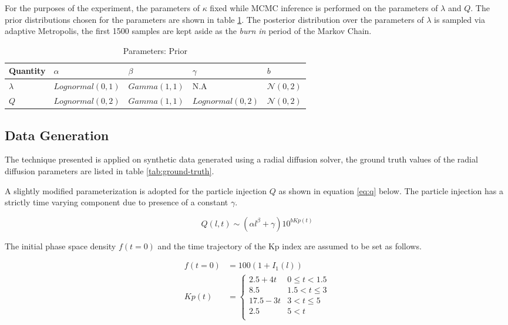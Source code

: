 \documentclass{article}
\begin{document}
For the purposes of the experiment, the parameters of $\kappa$ fixed while MCMC inference 
is performed on the parameters of $\lambda$ and $Q$. The prior distributions chosen for the parameters 
are shown in table \ref{tab:prior}. The posterior distribution over the parameters of $\lambda$ is 
sampled via adaptive Metropolis, the first 1500 samples are kept aside as the \emph{burn in} period
of the Markov Chain.

\begin{table}[t]
  \caption{Parameters: Prior}
  \label{tab:prior}
  \centering
  \begin{tabular}{lllll}
    \toprule
    \cmidrule{1-2}
    Quantity     & $\alpha$     & $\beta$ & $\gamma$ & $b$ \\
    \midrule
    $\lambda$ & $Lognormal(0, 1)$ & $Gamma(1, 1)$ & N.A & $\mathcal{N}(0, 2)$ \\
    $Q$ & $Lognormal(0, 2)$ & $Gamma(1, 1)$ & $Lognormal(0, 2)$ & $\mathcal{N}(0, 2)$ \\
    \bottomrule
  \end{tabular}
\end{table}


\subsection*{Data Generation}

The technique presented is applied on synthetic data generated using a radial diffusion solver, 
the ground truth values of the radial diffusion parameters are listed in table \ref{tab:ground-truth}.

A slightly modified parameterization is adopted for the particle injection $Q$ as shown in equation \ref{eq:q}
below. The particle injection has a strictly time varying component due to presence of a constant $\gamma$.

\begin{equation}\label{eq:q}
Q(l,t)  \sim (\alpha l^{\beta} + \gamma) 10^{b Kp(t)}
\end{equation}

The initial phase space density $f(t = 0)$ and the time trajectory 
of the Kp index are assumed to be set as follows.

\begin{align}
f(t = 0) &= 100(1 + I_1(l)) \\
Kp(t) &= \left\{\begin{matrix}
2.5 + 4t & 0 \leq t < 1.5\\ 
8.5 & 1.5 < t \leq 3\\ 
17.5-3t & 3 <  t \leq 5 \\ 
2.5 & 5 < t\\ 
\end{matrix}\right.
\end{align}
\end{document}
